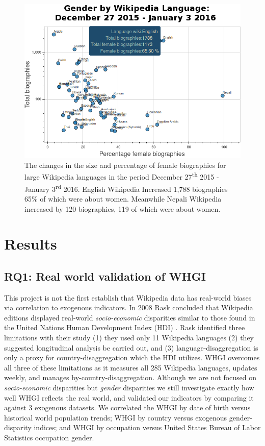 \documentclass{sig-alternate-05-2015}
\begin{document}
\begin{figure}
\includegraphics[width=\columnwidth]{figures/genderbylang.png} 
\caption{The changes in the size and percentage of female biographies for large Wikipedia languages in the period December 27\textsuperscript{th} 2015 - January 3\textsuperscript{rd} 2016. English Wikipedia Increased 1,788 biographies 65\% of which were about women. Meanwhile Nepali Wikipedia increased by 120 biographies, 119 of which were about women.}
\label{fig:genderbylang}
\end{figure}


\section{Results}
\subsection{RQ1: Real world validation of WHGI}
This project is not the first establish that Wikipedia data has real-world biases via correlation to exogenous indicators. In 2008 Rask concluded that Wikipedia editions displayed real-world \textit{socio-economic} disparities similar to those found in the United Nations Human Development Index (HDI) \cite{rask_reach_2008}. Rask identified three limitations with their study (1) they used only 11 Wikipedia languages (2) they suggested longitudinal analysis be carried out, and (3) language-disaggregation is only a proxy for country-disaggregation which the HDI utilizes. WHGI overcomes all three of these limitations as it measures all 285 Wikipedia languages, updates weekly, and manages by-country-disaggregation. Although we are not focused on \textit{socio-economic} disparities but \textit{gender} disparities we still investigate exactly how well WHGI reflects the real world, and validated our indicators by comparing it against 3 exogenous datasets. We correlated the WHGI by date of birth versus historical world population trends; WHGI by country versus exogenous gender-disparity indices; and WHGI by occupation versus United States Bureau of Labor Statistics occupation gender.
\end{document}
